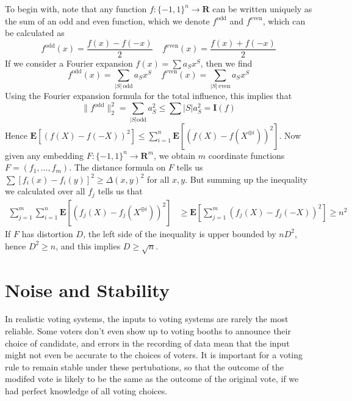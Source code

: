 To begin with, note that any function $f: \{ -1, 1 \}^n \to \mathbf{R}$ can be written uniquely as the sum of an odd and even function, which we denote $f^{\text{odd}}$ and $f^{\text{even}}$, which can be calculated as
%
\[ f^{\text{odd}}(x) = \frac{f(x) - f(-x)}{2}\ \ \ \ \ f^{\text{even}}(x) = \frac{f(x) + f(-x)}{2} \]
%
If we consider a Fourier expansion $f(x) = \sum a_S x^S$, then we find
%
\[ f^{\text{odd}}(x) = \sum_{|S|\ \text{odd}} a_S x^S\ \ \ \ \ f^{\text{even}}(x) = \sum_{|S|\ \text{even}} a_S x^S \]
%
Using the Fourier expansion formula for the total influence, this implies that
%
\[ \| f^{\text{odd}} \|_2^2 = \sum_{|S| \text{odd}} a_S^2 \leq \sum |S| a_S^2 = \mathbf{I}(f) \]
%
Hence $\mathbf{E}[(f(X) - f(-X))^2] \leq \sum_{i = 1}^n \mathbf{E}[(f(X) - f(X^{\oplus i}))^2]$. Now given any embedding $F: \{ -1, 1\}^n \to \mathbf{R}^m$, we obtain $m$ coordinate functions $F = (f_1, \dots, f_m)$. The distance formula on $F$ tells us $\sum [f_i(x) - f_i(y)]^2 \geq \Delta(x,y)^2$ for all $x,y$. But summing up the inequality we calculated over all $f_j$ tells us that
%
\begin{align*}
    \sum_{j = 1}^m \sum_{i = 1}^n \mathbf{E}[(f_j(X) - f_j(X^{\oplus i}))^2] &\geq \mathbf{E} \left[ \sum_{j = 1}^m (f_j(X) - f_j(-X))^2 \right] \geq n^2
\end{align*}
%
If $F$ has distortion $D$, the left side of the inequality is upper bounded by $nD^2$, hence $D^2 \geq n$, and this implies $D \geq \sqrt{n}$.

\section{Noise and Stability}

In realistic voting systems, the inputs to voting systems are rarely the most reliable. Some voters don't even show up to voting booths to announce their choice of candidate, and errors in the recording of data mean that the input might not even be accurate to the choices of voters. It is important for a voting rule to remain stable under these pertubations, so that the outcome of the modifed vote is likely to be the same as the outcome of the original vote, if we had perfect knowledge of all voting choices.


